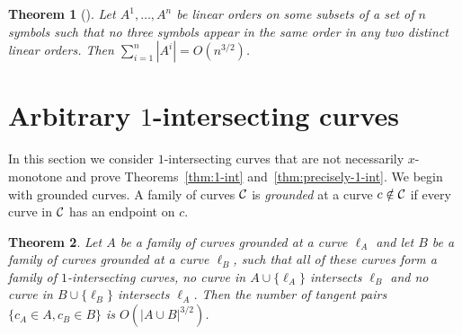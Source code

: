 \documentclass[11pt]{article}
\newtheorem{theorem}{Theorem}
\theoremstyle{definition}
\def\C{{\cal C}}
\begin{document}
\begin{theorem}[\cite{janzer2025}]
	\label{thm:intersection-reverse}
	Let $A^1,\ldots,A^n$ be linear orders on some subsets of a set of $n$ symbols such that no three symbols appear in the same order in any two distinct linear orders. Then $\sum_{i=1}^n |A^i| = O(n^{3/2})$.
\end{theorem}


\section{Arbitrary $1$-intersecting curves}
\label{sec:1-int}

In this section we consider $1$-intersecting curves that are not necessarily $x$-monotone and prove Theorems~\ref{thm:1-int} and~\ref{thm:precisely-1-int}.
We begin with grounded curves.
A family of curves $\C$ is \emph{grounded} at a curve $c \notin \C$ if every curve in $\C$ has an endpoint on $c$. 

\begin{theorem}\label{thm:2-grounded-disjoint}
	Let $A$ be a family of curves grounded at a curve $\ell_A$ and let $B$ be a family of curves grounded at a curve $\ell_B$, such that all of these curves form a family of $1$-intersecting curves, no curve in $A \cup \{\ell_A\}$ intersects $\ell_B$ and no curve in $B \cup \{\ell_B\}$ intersects $\ell_A$.
	Then the number of tangent pairs $\{c_A \in A, c_B \in B\}$ is $O(|A \cup B|^{3/2})$.  
\end{theorem}
\end{document}
